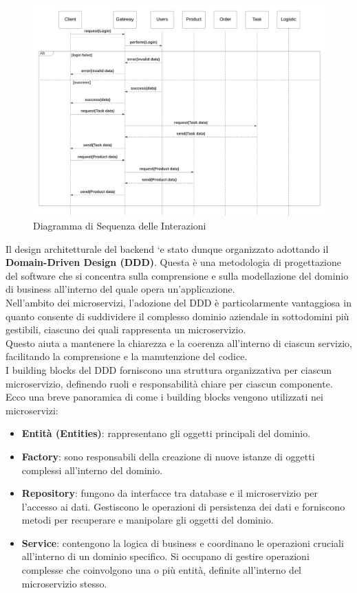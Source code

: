 \begin{figure}[H]
    \centering
    \includegraphics[width=\textwidth]{document/sections/img/sequenceDiagram.png}
    \caption{Diagramma di Sequenza delle Interazioni}
    \label{fig:sequenceDiagram}
\end{figure}
Il design architetturale del backend `e stato dunque organizzato adottando il \textbf{Domain-Driven Design (DDD)}.
Questa è una metodologia di progettazione del software che si concentra sulla comprensione e sulla modellazione
del dominio di business all'interno del quale opera un'applicazione.\\ Nell'ambito dei microservizi,
l'adozione del DDD è particolarmente vantaggiosa in quanto consente di suddividere il complesso dominio
aziendale in sottodomini più gestibili, ciascuno dei quali rappresenta un microservizio.\\ Questo aiuta a
mantenere la chiarezza e la coerenza all'interno di ciascun servizio, facilitando la comprensione e la
manutenzione del codice.\\
I building blocks del DDD forniscono una struttura organizzativa per ciascun microservizio,
definendo ruoli e responsabilità chiare per ciascun componente.\\ Ecco una breve panoramica di come i building
blocks vengono utilizzati nei microservizi:

\begin{itemize}
    \item \textbf{Entità (Entities)}: rappresentano gli oggetti principali del dominio.
    \item \textbf{Factory}: sono responsabili della creazione di nuove istanze di oggetti complessi all'interno del dominio.
    \item \textbf{Repository}: fungono da interfacce tra database e il microservizio per l'accesso ai dati. Gestiscono le operazioni di persistenza dei dati e forniscono metodi per recuperare e manipolare gli oggetti del dominio.
    \item \textbf{Service}: contengono la logica di business e coordinano le operazioni cruciali all'interno di un dominio specifico. Si occupano di gestire operazioni complesse che coinvolgono una o più entità, definite all'interno del microservizio stesso.
\end{itemize}
